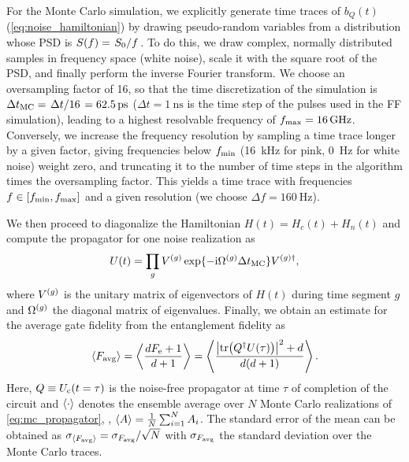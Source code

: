For the Monte Carlo simulation, we explicitly generate time traces of $b_Q(t)$ (\cf \cref{eq:noise_hamiltonian}) by drawing pseudo-random variables from a distribution whose PSD is $S(f) = \flatfrac{S_0}{f}$.
To do this, we draw complex, normally distributed samples in frequency space (\ie white noise), scale it with the square root of the PSD, and finally perform the inverse Fourier transform.
We choose an oversampling factor of 16, so that the time discretization of the simulation is $\Delta t_\mr{MC} = \flatfrac{\Delta t}{16} = \SI{62.5}{\pico\second}$ ($\Delta t = \SI{1}{\nano\second}$ is the time step of the pulses used in the FF simulation), leading to a highest resolvable frequency of $f_{\mathrm{max}} = \SI{16}{\giga\hertz}$.
Conversely, we increase the frequency resolution by sampling a time trace longer by a given factor, giving frequencies below $f_{\mathrm{min}}$ (\SI{16}{\kilo\hertz} for pink, \SI{0}{\hertz} for white noise) weight zero, and truncating it to the number of time steps in the algorithm times the oversampling factor.
This yields a time trace with frequencies $f\in [f_{\mathrm{min}}, f_{\mathrm{max}}]$ and a given resolution (we choose $\Delta f = \SI{160}{\hertz}$).

We then proceed to diagonalize the Hamiltonian $H(t) = H_c(t) + H_n(t)$ and compute the propagator for one noise realization as
\begin{equation}\label{eq:mc_propagator}
U(t) = \prod_g V^{(g)}\exp\lbrace -\mathrm{i}\Omega^{(g)}\Delta t_{\mathrm{MC}}\rbrace V^{(g)\dagger},
\end{equation}
where $V^{(g)}$ is the unitary matrix of eigenvectors of $H(t)$ during time segment $g$ and $\Omega^{(g)}$ the diagonal matrix of eigenvalues.
Finally, we obtain an estimate for the average gate fidelity \avgfid from the entanglement fidelity \entfid as
\begin{equation}
    \ev{\avgfid} = \ev{\frac{d\entfid + 1}{d+1}} = \ev{\frac{\abs{\tr(Q\adjoint U(\tau))}^2 + d}{d(d+1)}}.
\end{equation}
Here, $Q\equiv U_{\mathrm{c}}(t=\tau)$ is the noise-free propagator at time $\tau$ of completion of the circuit and $\ev{\cdot}$ denotes the ensemble average over $N$ Monte Carlo realizations of \cref{eq:mc_propagator}, \ie, $\ev{A}=\frac{1}{N}\sum_{i=1}^N A_i$.
The standard error of the mean can be obtained as $\sigma_{\ev{\avgfid}} = \sigma_{\avgfid} / \sqrt{N}$ with $\sigma_{F_{\mathrm{avg}}}$ the standard deviation over the Monte Carlo traces.
